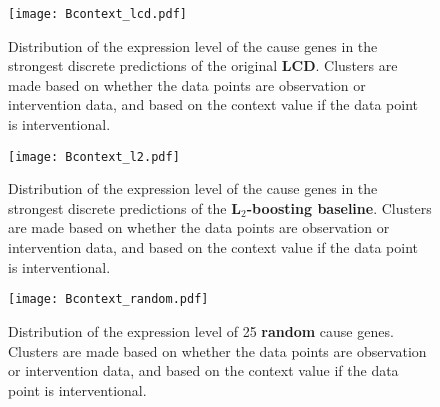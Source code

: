 \begin{figure}[H]
    \centering
    \texttt{[image: Bcontext\_lcd.pdf]}
    \caption{Distribution of the expression level of the cause genes in the strongest discrete predictions of the original \textbf{LCD}. Clusters are made based on whether the data points are observation or intervention data, and based on the context value if the data point is interventional.}
\end{figure}


\begin{figure}[H]
    \centering
    \texttt{[image: Bcontext\_l2.pdf]}
    \caption{Distribution of the expression level of the cause genes in the strongest discrete predictions of the \textbf{L$_2$-boosting baseline}. Clusters are made based on whether the data points are observation or intervention data, and based on the context value if the data point is interventional.}
\end{figure}

\begin{figure}[H]
    \centering
    \texttt{[image: Bcontext\_random.pdf]}
    \caption{Distribution of the expression level of 25 \textbf{random} cause genes. Clusters are made based on whether the data points are observation or intervention data, and based on the context value if the data point is interventional.}
\end{figure}


